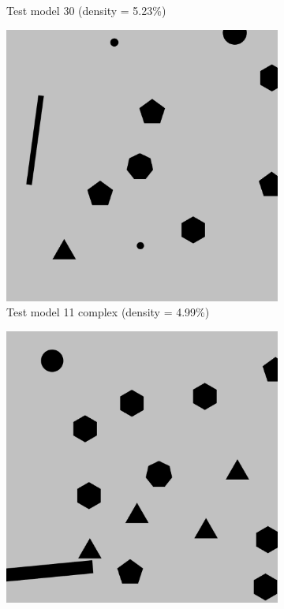 \documentclass[francais,RandD]{rapportPFE}
\begin{document}
\begin{figure}[h!]
\begin{subfigure}[t]{0.3\linewidth}
					\caption{Test model 30 (density = 5.23\%)}
					\label{fig:test_model_30}
			\end{subfigure}
			\hfill
			\begin{subfigure}[t]{0.3\linewidth}
					\includegraphics[width=\linewidth]{graphics/test_model_11_complex.png}
					\caption{Test model 11 complex (density = 4.99\%)}
					\label{fig:test_model_11_complex}
			\end{subfigure}
			\hfill
			\begin{subfigure}[t]{0.3\linewidth}
					\includegraphics[width=\linewidth]{graphics/test_model_15_complex.png}

\end{subfigure}
\end{figure}
\end{document}
